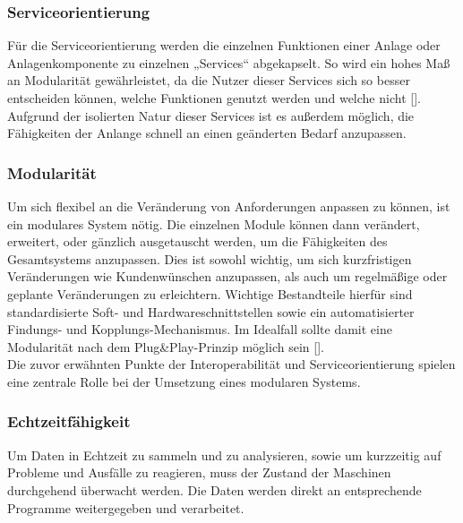 \subsubsection{Serviceorientierung}

Für die Serviceorientierung werden die einzelnen Funktionen einer Anlage oder Anlagenkomponente zu einzelnen „Services“ abgekapselt. So wird ein hohes Maß an Modularität gewährleistet, da die Nutzer dieser Services sich so besser entscheiden können, welche Funktionen genutzt werden und welche nicht [\cite{industrie40service}]. Aufgrund der isolierten Natur dieser Services ist es außerdem möglich, die Fähigkeiten der Anlange schnell an einen geänderten Bedarf anzupassen.

\subsubsection{Modularität}

Um sich flexibel an die Veränderung von Anforderungen anpassen zu können, ist ein modulares System nötig. Die einzelnen Module können dann verändert, erweitert, oder gänzlich ausgetauscht werden, um die Fähigkeiten des Gesamtsystems anzupassen. Dies ist sowohl wichtig, um sich kurzfristigen Veränderungen wie Kundenwünschen anzupassen, als auch um regelmäßige oder geplante Veränderungen zu erleichtern. Wichtige Bestandteile hierfür sind standardisierte Soft- und Hardwareschnittstellen sowie ein automatisierter Findungs- und Kopplungs-Mechanismus. Im Idealfall sollte damit eine Modularität nach dem Plug\&Play-Prinzip möglich sein [\cite{industrie40modularity}].\\
Die zuvor erwähnten Punkte der Interoperabilität und Serviceorientierung spielen eine zentrale Rolle bei der Umsetzung eines modularen Systems.

\subsubsection{Echtzeitfähigkeit}

Um Daten in Echtzeit zu sammeln und zu analysieren, sowie um kurzzeitig auf Probleme und Ausfälle zu reagieren, muss der Zustand der Maschinen durchgehend überwacht werden. Die Daten werden direkt an entsprechende Programme weitergegeben und verarbeitet.

